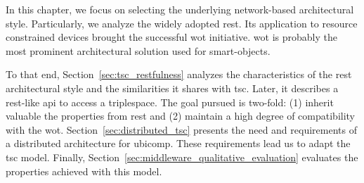In this chapter, we focus on selecting the underlying network-based architectural style.
Particularly, we analyze the widely adopted \acf{rest}.
Its application to resource constrained devices brought the successful \ac{wot} initiative.
\ac{wot} is probably the most prominent architectural solution used for smart-objects. %


To that end, Section~\ref{sec:tsc_restfulness} analyzes the characteristics of the \ac{rest} architectural style and the similarities it shares with \ac{tsc}.
Later, it describes a \ac{rest}-like \ac{api} to access a triplespace. %
The goal pursued is two-fold: (1) inherit valuable the properties from \ac{rest} and (2) maintain a high degree of compatibility with the \ac{wot}.
Section~\ref{sec:distributed_tsc} presents the need and requirements of a distributed architecture for \ac{ubicomp}.
These requirements lead us to adapt the \ac{tsc} model.
Finally, Section~\ref{sec:middleware_qualitative_evaluation} evaluates the properties achieved with this model.




